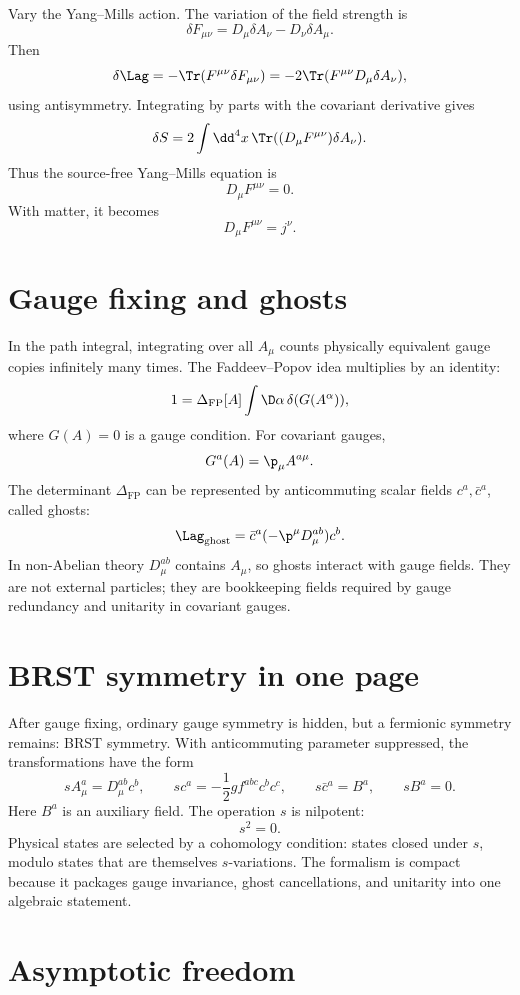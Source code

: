 Vary the Yang--Mills action.  The variation of the field strength is
\[
  \delta F_{\mu\nu}=D_\mu\delta A_\nu-D_\nu\delta A_\mu.
\]
Then
\[
  \delta\Lag
  =
  -\Tr(F^{\mu\nu}\delta F_{\mu\nu})
  =
  -2\Tr(F^{\mu\nu}D_\mu\delta A_\nu),
\]
using antisymmetry.  Integrating by parts with the covariant derivative gives
\[
  \delta S=
  2\int\dd^4x\,\Tr((D_\mu F^{\mu\nu})\delta A_\nu).
\]
Thus the source-free Yang--Mills equation is
\[
  D_\mu F^{\mu\nu}=0.
\]
With matter, it becomes
\[
  D_\mu F^{\mu\nu}=j^\nu.
\]

\section{Gauge fixing and ghosts}

In the path integral, integrating over all \(A_\mu\) counts physically equivalent gauge copies infinitely many times.  The Faddeev--Popov idea multiplies by an identity:
\[
  1=\Delta_{\text{FP}}[A]
  \int\D\alpha\,\delta(G(A^\alpha)),
\]
where \(G(A)=0\) is a gauge condition.  For covariant gauges,
\[
  G^a(A)=\p_\mu A^{a\mu}.
\]
The determinant \(\Delta_{\text{FP}}\) can be represented by anticommuting scalar fields \(c^a,\bar c^a\), called ghosts:
\[
  \Lag_{\text{ghost}}=\bar c^a(-\p^\mu D_\mu^{ab})c^b.
\]
In non-Abelian theory \(D_\mu^{ab}\) contains \(A_\mu\), so ghosts interact with gauge fields.  They are not external particles; they are bookkeeping fields required by gauge redundancy and unitarity in covariant gauges.

\section{BRST symmetry in one page}

After gauge fixing, ordinary gauge symmetry is hidden, but a fermionic symmetry remains: BRST symmetry.  With anticommuting parameter suppressed, the transformations have the form
\[
  sA_\mu^a=D_\mu^{ab}c^b,
  \qquad
  sc^a=-\frac12g f^{abc}c^bc^c,
  \qquad
  s\bar c^a=B^a,
  \qquad
  sB^a=0.
\]
Here \(B^a\) is an auxiliary field.  The operation \(s\) is nilpotent:
\[
  s^2=0.
\]
Physical states are selected by a cohomology condition: states closed under \(s\), modulo states that are themselves \(s\)-variations.  The formalism is compact because it packages gauge invariance, ghost cancellations, and unitarity into one algebraic statement.

\section{Asymptotic freedom}

